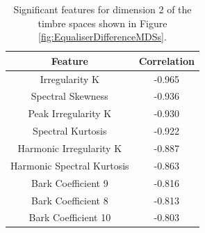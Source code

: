 		\begin{table}[h!]
			\centering
			\begin{tabular}{|c|c|}
				\hline
				\bf{Feature} & \bf{Correlation} \\
				\hline
				\hline
				Irregularity K & -0.965 \\
				\hline
				Spectral Skewness & -0.936 \\
				\hline
				Peak Irregularity K & -0.930 \\
				\hline
				Spectral Kurtosis & -0.922 \\
				\hline
				Harmonic Irregularity K & -0.887 \\
				\hline
				Harmonic Spectral Kurtosis & -0.863 \\
				\hline
				Bark Coefficient 9 & -0.816 \\
				\hline
				Bark Coefficient 8 & -0.813 \\
				\hline
				Bark Coefficient 10 & -0.803 \\
				\hline
			\end{tabular}
			\caption{Significant features for dimension 2 of the timbre spaces shown in Figure 
				 \ref{fig:EqualiserDifferenceMDSs}.}
			\label{tab:EqualiserDifferenceFeaturesDim2}
		\end{table}
